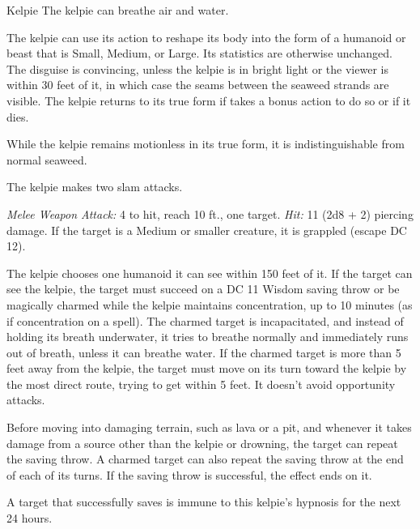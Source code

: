 \documentclass[10pt,a4paper,twoside,bg=print,twocolumn,openany,nodeprecatedcode]{dndbook}
\begin{document}
\begin{DndMonster}[float=t]{Kelpie}
\DndMonsterBasics[
armor-class = {14 (natural armor)},
hit-points = {\DndDice{9d8 + 27}},
speed = {10 ft., swim 30 ft.}
]
\DndMonsterAbilityScores[
 str = 14,
 dex = 14,
 con = 16,
 int = 7,
 wis = 12,
 cha = 10
]
\DndMonsterDetails[
skills = {Perception +3, Stealth +4},
damage-resistances = {fire, bludgeoning, piercing},
condition-immunities = {blinded, deafened, exhaustion},
senses = {blindsight 60 ft., passive perception 13},
languages = {Common, Sylvan},
challenge = 4,
]
The kelpie can breathe air and water.

The kelpie can use its action to reshape its body into the form of a humanoid or beast that is Small, Medium, or Large. Its statistics are otherwise unchanged. The disguise is convincing, unless the kelpie is in bright light or the viewer is within 30 feet of it, in which case the seams between the seaweed strands are visible. The kelpie returns to its true form if takes a bonus action to do so or if it dies.

While the kelpie remains motionless in its true form, it is indistinguishable from normal seaweed.

The kelpie makes two slam attacks.

\textsl{Melee Weapon Attack:} 4 to hit, reach 10 ft., one target. \textsl{Hit:} 11 (2d8 + 2) piercing damage. If the target is a Medium or smaller creature, it is grappled (escape DC 12).

The kelpie chooses one humanoid it can see within 150 feet of it. If the target can see the kelpie, the target must succeed on a DC 11 Wisdom saving throw or be magically charmed while the kelpie maintains concentration, up to 10 minutes (as if concentration on a spell). The charmed target is incapacitated, and instead of holding its breath underwater, it tries to breathe normally and immediately runs out of breath, unless it can breathe water. If the charmed target is more than 5 feet away from the kelpie, the target must move on its turn toward the kelpie by the most direct route, trying to get within 5 feet. It doesn't avoid opportunity attacks.

Before moving into damaging terrain, such as lava or a pit, and whenever it takes damage from a source other than the kelpie or drowning, the target can repeat the saving throw. A charmed target can also repeat the saving throw at the end of each of its turns. If the saving throw is successful, the effect ends on it.

A target that successfully saves is immune to this kelpie's hypnosis for the next 24 hours.

\end{DndMonster}
\end{document}
